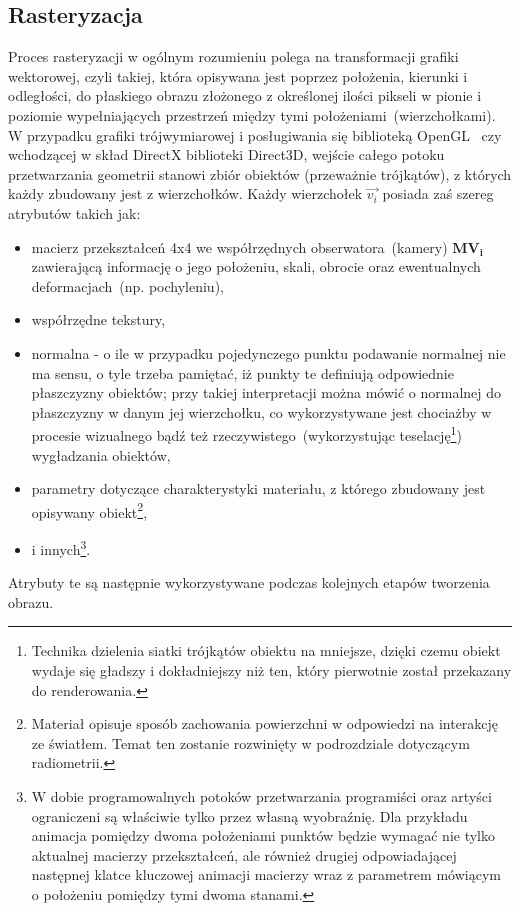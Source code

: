 \subsection{Rasteryzacja}
Proces rasteryzacji w ogólnym rozumieniu polega na transformacji grafiki wektorowej, czyli takiej, która opisywana jest poprzez położenia, kierunki i odległości, do płaskiego obrazu złożonego z określonej ilości pikseli w pionie i poziomie wypełniających przestrzeń między tymi położeniami~(wierzchołkami). W przypadku grafiki trójwymiarowej i posługiwania się biblioteką OpenGL~\cite{OPENGL46} czy wchodzącej w skład DirectX biblioteki Direct3D, wejście całego potoku przetwarzania geometrii stanowi zbiór obiektów (przeważnie trójkątów), z których każdy zbudowany jest z wierzchołków. Każdy wierzchołek $\vec{v_i}$ posiada zaś szereg atrybutów takich jak:
\begin{itemize}
\item macierz przekształceń 4x4 we współrzędnych obserwatora~(kamery) $\mathbf{MV_i}$ zawierającą informację o jego położeniu, skali, obrocie oraz ewentualnych deformacjach~(np. pochyleniu),
\item współrzędne tekstury,
\item normalna - o ile w przypadku pojedynczego punktu podawanie normalnej nie ma sensu, o tyle trzeba pamiętać, iż punkty te definiują odpowiednie płaszczyzny obiektów; przy takiej interpretacji można mówić o normalnej do płaszczyzny w danym jej wierzchołku, co wykorzystywane jest chociażby w procesie wizualnego bądź też rzeczywistego~(wykorzystując teselację\footnote{Technika dzielenia siatki trójkątów obiektu na mniejsze, dzięki czemu obiekt wydaje się gładszy i dokładniejszy niż ten, który pierwotnie został przekazany do renderowania.}) wygładzania obiektów,
\item parametry dotyczące charakterystyki materiału, z którego zbudowany jest opisywany obiekt\footnote{Materiał opisuje sposób zachowania powierzchni w odpowiedzi na interakcję ze światłem. Temat ten zostanie rozwinięty w podrozdziale dotyczącym radiometrii. },
\item i innych\footnote{W dobie programowalnych potoków przetwarzania programiści oraz artyści ograniczeni są właściwie tylko przez własną wyobraźnię. Dla przykładu animacja pomiędzy dwoma położeniami punktów będzie wymagać nie tylko aktualnej macierzy przekształceń, ale również drugiej odpowiadającej następnej klatce kluczowej animacji macierzy wraz z parametrem mówiącym o położeniu pomiędzy tymi dwoma stanami.}.
\end{itemize}
Atrybuty te są następnie wykorzystywane podczas kolejnych etapów tworzenia obrazu.

